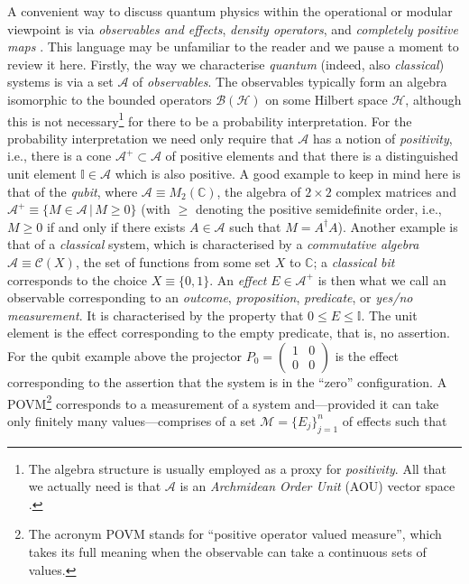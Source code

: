 \documentclass[11pt]{amsart}
\theoremstyle{plain}%
\theoremstyle{definition}
\theoremstyle{remark}
\begin{document}
A convenient way to discuss quantum physics within the operational or modular viewpoint is via \emph{observables and effects}, \emph{density operators}, and \emph{completely positive maps} \cite{ludwig_foundations_1983,davies_quantum_1976}. This language may be unfamiliar to the reader and we pause a moment to review it here. Firstly, the way we characterise \emph{quantum} (indeed, also \emph{classical}) systems is via a set $\mathcal{A}$ of \emph{observables}. The observables typically form an algebra isomorphic to the bounded operators $\mathcal{B}(\mathcal{H})$ on some Hilbert space $\mathcal{H}$, although this is not necessary\footnote{The algebra structure is usually employed as a proxy for \emph{positivity}. All that we actually need is that $\mathcal{A}$ is an \emph{Archmidean Order Unit} (AOU) vector space \cite{paulsen_vector_2009,kleinmann_typical_2013}.} for there to be a probability interpretation. For the probability interpretation we need only require that $\mathcal{A}$ has a notion of \emph{positivity}, i.e., there is a cone $\mathcal{A}^+ \subset \mathcal{A}$ of positive elements and that there is a distinguished unit element $\mathbb{I}\in\mathcal{A}$ which is also positive. A good example to keep in mind here is that of the \emph{qubit}, where $\mathcal{A}\equiv M_2(\mathbb{C})$, the algebra of $2\times 2$ complex matrices and $\mathcal{A}^+ \equiv \{M\in \mathcal{A}\,|\, M\ge 0\}$ (with $\ge$ denoting the positive semidefinite order, i.e., $M\ge 0$ if and only if there exists $A\in \mathcal{A}$ such that $M = A^\dag A$). Another example is that of a \emph{classical} system, which is characterised by a \emph{commutative algebra} $\mathcal{A}\equiv \mathcal{C}(X)$, the set of functions from some set $X$ to $\mathbb{C}$; a \emph{classical bit} corresponds to the choice $X \equiv \{0,1\}$. An \emph{effect} $E\in\mathcal{A}^+$ is then what we call an observable corresponding to an \emph{outcome}, \emph{proposition}, \emph{predicate}, or \emph{yes/no measurement}. It is characterised by the property that $0\le E\le \mathbb{I}$. The unit element is the effect corresponding to the empty predicate, that is, no assertion. For the qubit example above the projector $P_0 = \left(\begin{smallmatrix} 1 & 0 \\ 0 & 0\end{smallmatrix}\right)$ is the effect corresponding to the assertion that the system is in the ``zero'' configuration. A POVM\footnote{The acronym POVM stands for ``positive operator valued measure'', which takes its full meaning when the observable can take a continuous sets of values. } corresponds to a measurement of a system and---provided it can take only finitely many values---comprises of a set $\mathcal{M} = \{E_j\}_{j=1}^n$ of effects such that 
\end{document}
